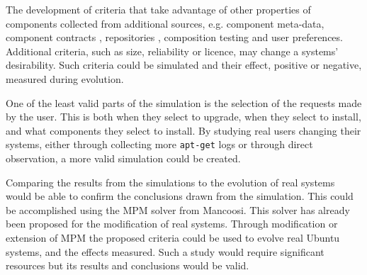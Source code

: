 The development of criteria that take advantage of other properties of components collected from additional sources, e.g. component meta-data, component contracts \citep{Watkins1999}, repositories \citep{Guo2000}, 
composition testing \citep{XuejieZhang2008} and user preferences.
Additional criteria, such as size, reliability or licence, may change a systems' desirability.
Such criteria could be simulated and their effect, positive or negative, measured during evolution.

One of the least valid parts of the simulation is the selection of the requests made by the user.
This is both when they select to upgrade, when they select to install, and what components they select to install.
By studying real users changing their systems, either through collecting more \texttt{apt-get} logs or through direct observation,
a more valid simulation could be created.

Comparing the results from the simulations to the evolution of real systems would be able to confirm the conclusions drawn from the simulation.
This could be accomplished using the MPM solver \citep{abate2011} from Mancoosi.
This solver has already been proposed for the modification of real systems.
Through modification or extension of MPM the proposed criteria could be used to evolve real Ubuntu systems, and the effects measured.
Such a study would require significant resources but its results and conclusions would be valid.    
